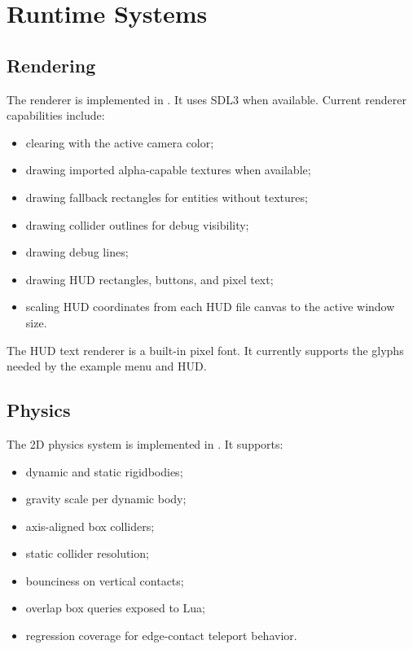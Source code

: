 \chapter{Runtime Systems}

\section{Rendering}

The renderer is implemented in . It uses SDL3 when available. Current renderer capabilities include:

\begin{itemize}
  \item clearing with the active camera color;
  \item drawing imported alpha-capable textures when available;
  \item drawing fallback rectangles for entities without textures;
  \item drawing collider outlines for debug visibility;
  \item drawing debug lines;
  \item drawing HUD rectangles, buttons, and pixel text;
  \item scaling HUD coordinates from each HUD file canvas to the active window size.
\end{itemize}

The HUD text renderer is a built-in pixel font. It currently supports the glyphs needed by the example menu and HUD.

\section{Physics}

The 2D physics system is implemented in . It supports:

\begin{itemize}
  \item dynamic and static rigidbodies;
  \item gravity scale per dynamic body;
  \item axis-aligned box colliders;
  \item static collider resolution;
  \item bounciness on vertical contacts;
  \item overlap box queries exposed to Lua;
  \item regression coverage for edge-contact teleport behavior.
\end{itemize}

